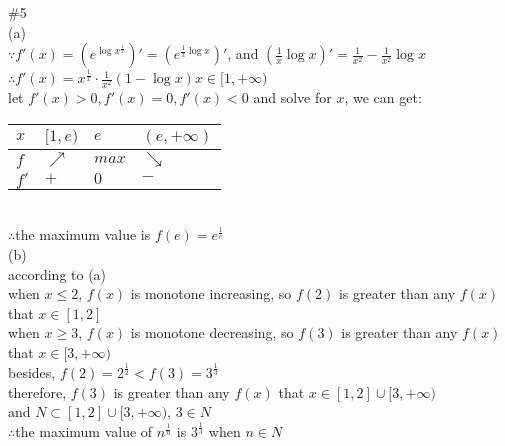 \documentclass{article}
\begin{document}
\textcolor[rgb]{0.00,0.00,0.50}{\#5}\\

(a)\\

$\because$\qquad$f'(x)=\left(e^{\log x^{\displaystyle\frac{1}{x}}}\right)'=\left(e^{\displaystyle\frac{1}{x}\log x}\right)'$, and $\left(\displaystyle\frac{1}{x}\log x\right)'=\displaystyle\frac{1}{x^2}-\frac{1}{x^2}\log x$\\

$\therefore$\qquad$f'(x)=\displaystyle x^{\frac{1}{x}}\cdot\frac{1}{x^2}\left(1-\log x\right)$\qquad$x\in[1,+\infty)$\\

let $f'(x)>0, f'(x)=0, f'(x)<0$ and solve for $x$, we can get:\\

\begin{tabular}{|l|l|l|l|}
  \hline
  $x$ & $[1,e)$ & $e$ & $(e,+\infty)$\\ \hline
  $f$ & $\nearrow$ & $max$ & $\searrow$\\ \hline
  $f'$ & $+$ & $0$ & $-$\\
  \hline
\end{tabular}\\

$\therefore$\qquad the maximum value is $\displaystyle f(e)=e^{\frac{1}{e}}$\\

(b)\\

according to (a)\\

when $x\leq2$, $f(x)$ is monotone increasing, so $f(2)$ is greater than any $f(x)$ that $x\in[1,2]$\\

when $x\geq3$, $f(x)$ is monotone decreasing, so $f(3)$ is greater than any $f(x)$ that $x\in[3,+\infty)$\\

besides, $f(2)=\displaystyle2^{\frac{1}{2}}<f(3)=3^{\frac{1}{3}}$\\

therefore, $f(3)$ is greater than any $f(x)$ that $x\in[1,2]\cup[3,+\infty)$\\

and $N\subset[1,2]\cup[3,+\infty)$, $3\in N$\\

$\therefore$\qquad the maximum value of $\displaystyle n^{\frac{1}{n}}$ is $\displaystyle3^{\frac{1}{3}}$ when $n\in N$\\
\end{document}
